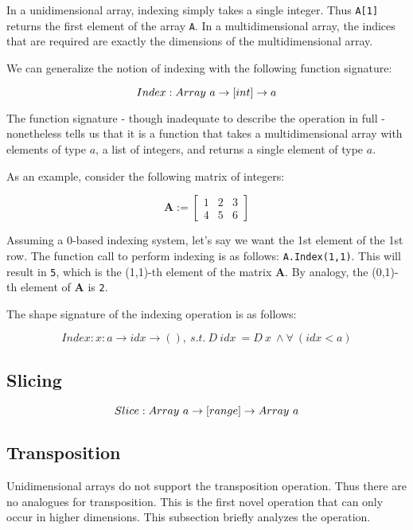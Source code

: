 \documentclass{article}
\begin{document}
In a unidimensional array, indexing simply takes a single integer. Thus \texttt{A[1]} returns the first element of the array \texttt{A}. In a multidimensional array, the indices that are required are exactly the dimensions of the multidimensional array.

We can generalize the notion of indexing with the following function signature:

$$
Index : Array \ a \rightarrow [int] \rightarrow a\\
$$

The function signature - though inadequate to describe the operation in full -  nonetheless tells us that it is a function that takes a multidimensional array with elements of type $a$, a list of integers, and returns a single element of type $a$.

As an example, consider the following matrix of integers:

\begin{equation*}
  \mathbf{A} :=
\begin{bmatrix}
  1 & 2 & 3\\
  4 & 5 & 6
\end{bmatrix}
\end{equation*}

Assuming a 0-based indexing system, let's say we want the 1st element of the 1st row. The function call to perform indexing is as follows: \texttt{A.Index(1,1)}. This will result in \texttt{5}, which is the (1,1)-th element of the matrix $\mathbf{A}$. By analogy, the (0,1)-th element of $\mathbf{A}$ is \texttt{2}.

The shape signature of the indexing operation is as follows:

$$
Index: x:a \rightarrow idx \rightarrow () ,\ s.t.\ D\ idx\ = D\ x\ \wedge \forall\ (idx < a)
$$

\subsection{Slicing}

$$
Slice : Array\ a \rightarrow [range] \rightarrow Array\ a\\
$$



\subsection{Transposition}

Unidimensional arrays do not support the transposition operation. Thus there are no analogues for transposition. This is the first novel operation that can only occur in higher dimensions. This subsection briefly analyzes the operation.
\end{document}
